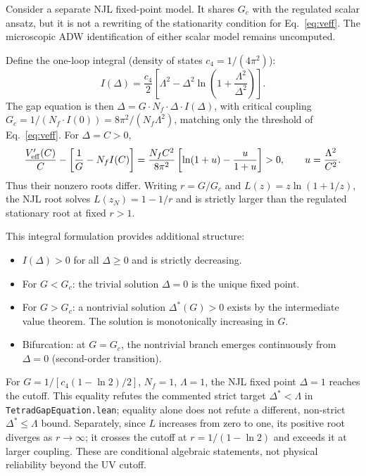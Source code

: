 \documentclass[aps,prd,twocolumn,superscriptaddress,nofootinbib]{revtex4-2}
\begin{document}
Consider a separate NJL fixed-point model. It shares $G_c$ with the
regulated scalar ansatz, but it is not a rewriting of the stationarity
condition for Eq.~\eqref{eq:veff}. The microscopic ADW identification
of either scalar model remains uncomputed.

Define the one-loop integral (density of states $c_4 = 1/(4\pi^2)$):
\begin{equation}
I(\Delta) = \frac{c_4}{2}\!\left[\Lambda^2 - \Delta^2 \ln\!\left(1 + \frac{\Lambda^2}{\Delta^2}\right)\right].
\label{eq:gap_integral}
\end{equation}
The gap equation is then $\Delta = G \cdot N_f \cdot \Delta \cdot I(\Delta)$,
with critical coupling $G_c = 1/(N_f \cdot I(0)) = 8\pi^2/(N_f \Lambda^2)$,
matching only the threshold of Eq.~\eqref{eq:veff}. For $\Delta=C>0$,
\begin{equation}
 \frac{V_{\rm eff}'(C)}{C}-\left[\frac1G-N_fI(C)\right]
 =\frac{N_fC^2}{8\pi^2}
 \left[\ln(1+u)-\frac{u}{1+u}\right]>0,
 \qquad u=\frac{\Lambda^2}{C^2}.
\end{equation}
Thus their nonzero roots differ. Writing $r=G/G_c$ and
$L(z)=z\ln(1+1/z)$, the NJL
root solves $L(z_N)=1-1/r$ and is strictly larger than the regulated
stationary root at fixed $r>1$.

This integral formulation provides additional structure:
\begin{itemize}
\item $I(\Delta) > 0$ for all $\Delta \geq 0$ and is strictly decreasing.
\item For $G < G_c$: the trivial solution $\Delta = 0$ is the unique fixed point.
\item For $G > G_c$: a nontrivial solution $\Delta^*(G) > 0$ exists by the
  intermediate value theorem. The solution is monotonically increasing in $G$.
\item Bifurcation: at $G = G_c$, the nontrivial branch emerges continuously
  from $\Delta = 0$ (second-order transition).
\end{itemize}

For $G=1/[c_4(1-\ln2)/2]$, $N_f=1$, $\Lambda=1$, the NJL
fixed point $\Delta=1$ reaches the cutoff. This equality refutes the
commented strict target $\Delta^*<\Lambda$ in
\texttt{TetradGapEquation.lean}; equality alone does not refute a different,
non-strict $\Delta^*\leq\Lambda$ bound. Separately, since $L$ increases
from zero to one, its positive root diverges as $r\to\infty$; it crosses
the cutoff at $r=1/(1-\ln2)$ and exceeds it at larger coupling. These are
conditional algebraic statements, not physical reliability beyond the UV cutoff.
\end{document}
